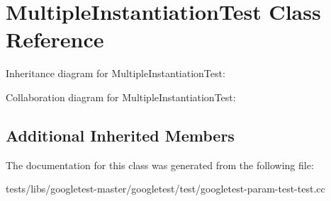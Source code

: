 \hypertarget{classMultipleInstantiationTest}{}\section{Multiple\+Instantiation\+Test Class Reference}
\label{classMultipleInstantiationTest}


Inheritance diagram for Multiple\+Instantiation\+Test\+:


Collaboration diagram for Multiple\+Instantiation\+Test\+:
\subsection*{Additional Inherited Members}


The documentation for this class was generated from the following file\+:\begin{DoxyCompactItemize}
\item 
tests/libs/googletest-\/master/googletest/test/googletest-\/param-\/test-\/test.\+cc\end{DoxyCompactItemize}
